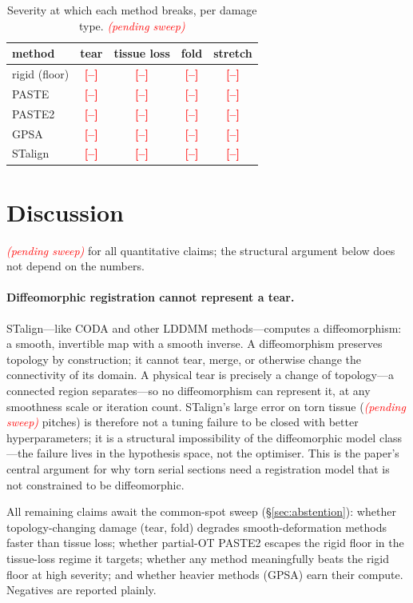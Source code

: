 \documentclass[11pt]{article}
\newcommand{\todo}[1]{\textcolor{red}{\textbf{[#1]}}}
\newcommand{\pending}{\textcolor{red}{\emph{(pending sweep)}}}
\begin{document}
\begin{table}[h]
  \centering
  \caption{Severity at which each method breaks, per damage type. \pending}
  \label{tab:leaderboard}
  \begin{tabular}{lcccc}
    \toprule
    method & tear & tissue loss & fold & stretch \\
    \midrule
    rigid (floor) & \todo{--} & \todo{--} & \todo{--} & \todo{--} \\
    PASTE  & \todo{--} & \todo{--} & \todo{--} & \todo{--} \\
    PASTE2 & \todo{--} & \todo{--} & \todo{--} & \todo{--} \\
    GPSA   & \todo{--} & \todo{--} & \todo{--} & \todo{--} \\
    STalign & \todo{--} & \todo{--} & \todo{--} & \todo{--} \\
    \bottomrule
  \end{tabular}
\end{table}

\section{Discussion}
\pending{} for all quantitative claims; the structural argument below does not
depend on the numbers.

\paragraph{Diffeomorphic registration cannot represent a tear.} STalign---like
CODA and other LDDMM methods---computes a diffeomorphism: a smooth, invertible map
with a smooth inverse. A diffeomorphism preserves topology by construction; it
cannot tear, merge, or otherwise change the connectivity of its domain. A physical
tear is precisely a change of topology---a connected region separates---so no
diffeomorphism can represent it, at any smoothness scale or iteration count.
STalign's large error on torn tissue (\pending{} pitches) is therefore not a
tuning failure to be closed with better hyperparameters; it is a structural
impossibility of the diffeomorphic model class---the failure lives in the
hypothesis space, not the optimiser. This is the paper's central argument for why
torn serial sections need a registration model that is not constrained to be
diffeomorphic.

All remaining claims await the common-spot sweep (\S\ref{sec:abstention}): whether
topology-changing damage (tear, fold) degrades smooth-deformation methods faster
than tissue loss; whether partial-OT PASTE2 escapes the rigid floor in the
tissue-loss regime it targets; whether any method meaningfully beats the rigid
floor at high severity; and whether heavier methods (GPSA) earn their compute.
Negatives are reported plainly.
\end{document}
